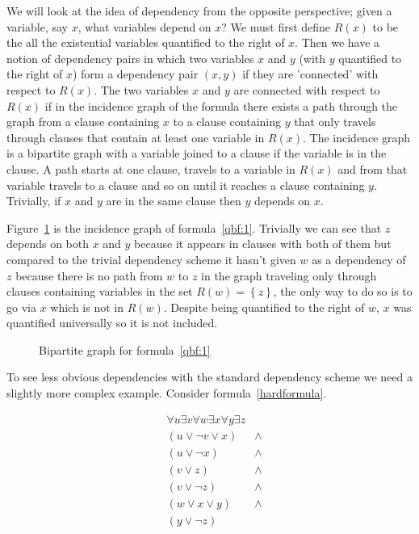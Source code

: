 We will look at the idea of dependency from the opposite perspective; given a variable, say $x$, what variables depend on $x$? We must first define $R(x)$ to be the all the existential variables quantified to the right of $x$. Then we have a notion of dependency pairs in which two variables $x$ and $y$ (with $y$ quantified to the right of $x$) form a dependency pair $(x,y)$ if they are 'connected' with respect to $R(x)$. The two variables $x$ and $y$ are connected with respect to $R(x)$ if in the incidence graph of the formula there exists a path through the graph from a clause containing $x$ to a clause containing $y$ that only travels through clauses that contain at least one variable in $R(x)$. The incidence graph is a bipartite graph with a variable joined to a clause if the variable is in the clause. A path starts at one clause, travels to a variable in $R(x)$ and from that variable travels to a clause and so on until it reaches a clause containing $y$. Trivially, if $x$ and $y$ are in the same clause then $y$ depends on $x$.

Figure~\ref{bigrapheasy} is the incidence graph of formula~\ref{qbf:1}. Trivially we can see that $z$ depends on both $x$ and $y$ because it appears in clauses with both of them but compared to the trivial dependency scheme it hasn't given $w$ as a dependency of $z$ because there is no path from $w$ to $z$ in the graph traveling only through clauses containing variables in the set $R(w)=\left \{z\right \}$, the only way to do so is to go via $x$ which is not in $R(w)$. Despite being quantified to the right of $w$, $x$ was quantified universally so it is not included.

\begin{figure}
\begin{CenteredBox}

\end{CenteredBox}
\caption{Bipartite graph for formula~\ref{qbf:1}}
\label{bigrapheasy}
\end{figure}

To see less obvious dependencies with the standard dependency scheme we need a slightly more complex example. Consider formula~\ref{hardformula}.

\begin{equation}
\label{hardformula}
\begin{aligned}
&\forall u \exists v \forall w \exists x \forall y \exists z\\
&(u \lor \neg v \lor x) &\land\\
&(u \lor \neg x) &\land\\
&(v \lor z) &\land\\
&(v \lor \neg z) &\land\\
&(w \lor x \lor y) &\land\\
&(y \lor \neg z)\\
\end{aligned}
\end{equation}

